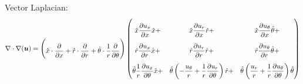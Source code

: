 \documentclass{kthreport}
\begin{document}
Vector Laplacian:
\begin{eqnarray}
	\nabla\cdot\nabla(\bm{u}) = \def\arraystretch{2.5} \begin{pmatrix}
		\hat{x}\cdot\dfrac{\partial}{\partial x} + \hat{r}\cdot\dfrac{\partial}{\partial r} + \hat{\theta}\cdot\dfrac{1}{r}\dfrac{\partial}{\partial \theta}
	\end{pmatrix}
	\begin{pmatrix}
	 \hat{x}\dfrac{\partial u_{x}}{\partial x}\hat{x} + & \hat{x}\dfrac{\partial u_{r}}{\partial x}\hat{r}  +  & \hat{x}\dfrac{\partial u_{\theta}}{\partial x}\hat{\theta} +\\
	 \hat{r}\dfrac{\partial u_{x}}{\partial r}\hat{x}  + &\hat{r}\dfrac{\partial u_{r}}{\partial r}\hat{r}   +  &\hat{r}\dfrac{\partial u_{\theta}}{\partial r}\hat{\theta} +\\
	 \hat{\theta}\dfrac{1}{r}\dfrac{\partial u_{x}}{\partial \theta}\hat{x} + &\hat{\theta}\left(-\dfrac{u_{\theta}}{r} \color{black} + \dfrac{1}{r}\dfrac{\partial u_{r}}{\partial \theta} \right)\hat{r} 	+ &\hat{\theta}\left( \dfrac{u_{r}}{r} +\dfrac{1}{r} \dfrac{\partial u_{\theta}}{\partial \theta} \right)\hat{\theta}
\end{pmatrix} \nonumber 
\end{eqnarray}
\end{document}
